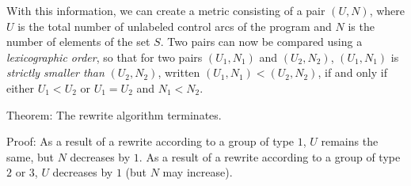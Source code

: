 With this information, we can create a metric consisting of a pair
$(U,N)$, where $U$ is the total number of unlabeled control arcs of
the program and $N$ is the number of elements of the set $S$.  Two
pairs can now be compared using a \emph{lexicographic order}, so that
for two pairs $(U_1,N_1)$ and $(U_2,N_2)$, $(U_1,N_1)$ is
\emph{strictly smaller than} $(U_2,N_2)$, written $(U_1,N_1) <
(U_2,N_2)$, if and only if either $U_1 < U_2$ or $U_1 = U_2$ and $N_1
< N_2$.

Theorem: The rewrite algorithm terminates.

Proof: As a result of a rewrite according to a group of type $1$, $U$
remains the same, but $N$ decreases by $1$.  As a result of a rewrite
according to a group of type $2$ or $3$, $U$ decreases by $1$ (but $N$
may increase).

